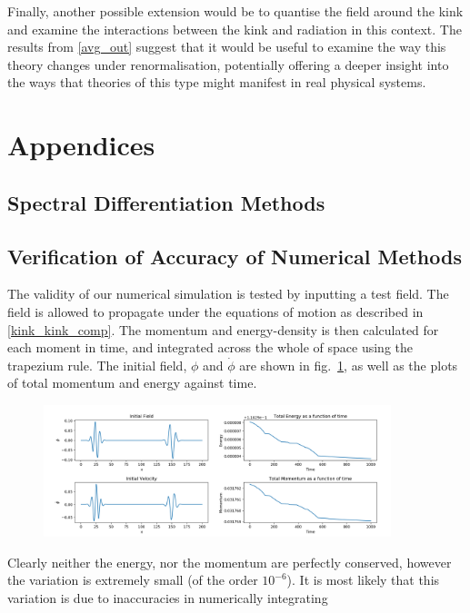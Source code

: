\documentclass[11pt, oneside]{article}  	%
\numberwithin{equation}{section}
\begin{document}
Finally, another possible extension would be to quantise the field around the kink and examine the interactions between the kink and radiation in this context. The results from \textsection \ref{avg_out} suggest that it would be useful to examine the way this theory changes under renormalisation, potentially offering a deeper insight into the ways that theories of this type might manifest in real physical systems.





 \renewcommand\thesection{}
 \renewcommand\thesubsection{\Alph{subsection}}
 \section{Appendices}
 \subsection{Spectral Differentiation Methods} \label{spectral}
 \subsection{Verification of Accuracy of Numerical Methods}\label{tests}
 The validity of our numerical simulation is tested by inputting a test field. The field is allowed to propagate under the equations of motion as described in \textsection \ref{kink_kink_comp}. The momentum and energy-density is then calculated for each moment in time, and integrated across the whole of space using the trapezium rule. The initial field, $\phi$ and $\dot{\phi}$ are shown in fig.~\ref{test_field}, as well as the plots of total momentum and energy against time.\par
\begin{figure}
\centering
\includegraphics[width=0.9\textwidth]{test_field_energy.png}
 \label{test_field}
\end{figure}
Clearly neither the energy, nor the momentum are perfectly conserved, however the variation is extremely small (of the order $10^{-6}$). It is most likely that this variation is due to inaccuracies in numerically integrating 


\end{document}
